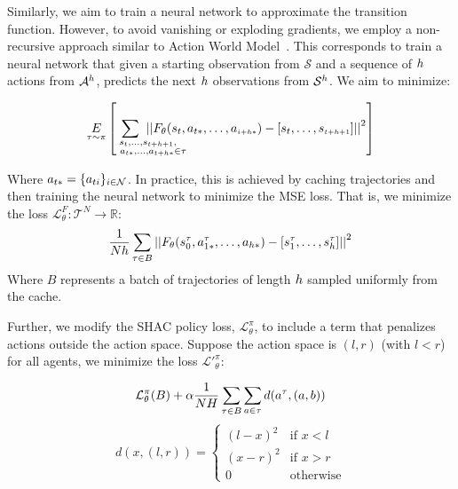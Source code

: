 Similarly, we aim to train a neural network to approximate the transition function. However, to avoid vanishing or exploding gradients, we employ a non-recursive approach similar to Action World Model~\cite{Ma24}. This corresponds to train a neural network that given a starting observation from $\mathcal{S}$ and a sequence of $h$ actions from $\mathcal{A}^h$, predicts the next $h$ observations from $\mathcal{S}^h$. We aim to minimize:

\begin{align*}
    \underset{\tau\sim\pi}{E}\left[\hspace{-1.2cm}\sum_{\scriptscriptstyle \hspace{1cm}\substack{s_t,\dots,s_{t+h+1},\\\hspace{.3cm}a_{t*},\dots,a_{t+h*}\in\tau}}\hspace{-1.2cm} \left|\left| \transition_{\theta}(s_t, a_{t*},\dots,a_{\scriptscriptstyle i+h*}) - [s_t,\dots,s_{\scriptscriptstyle t+h+1}] \right|\right|^2\right] 
\end{align*}

Where $a_{t*}=\{a_{ti}\}_{i\in\mathcal{N}}$. In practice, this is achieved by caching trajectories and then training the neural network to minimize the MSE loss. That is, we minimize the loss $\mathcal{L}_\theta^{F}:\mathcal{T}^N\rightarrow\mathbb{R}$:
$$ \frac{1}{Nh}\sum_{\tau \in B}\left|\left| F_{\theta}(s_0^\tau, a_{1*}^\tau, \dots, a_{h*}) - \left[ s^\tau_1, \dots, s^\tau_h \right] \right|\right|^2 $$
Where $B$ represents a batch of trajectories of length $h$ sampled uniformly from the cache.

Further, we modify the SHAC policy loss, $\mathcal{L}_\theta^{\pi}$, to include a term that penalizes actions outside the action space. Suppose the action space is $(l,r)$ (with $l<r$) for all agents, we minimize the loss $\mathcal{L'}_\theta^\pi:$

$$\mathcal{L}_\theta^\pi(B) + \alpha \frac{1}{NH}\sum_{\tau\in B}\sum_{a\in\tau} d(a^\tau,(a,b))$$
$$d(x,(l,r)) = \begin{cases}(l-x)^2 & \text{if } x < l \\ (x-r)^2 & \text{if } x > r \\ 0 & \text{otherwise} \end{cases}$$

